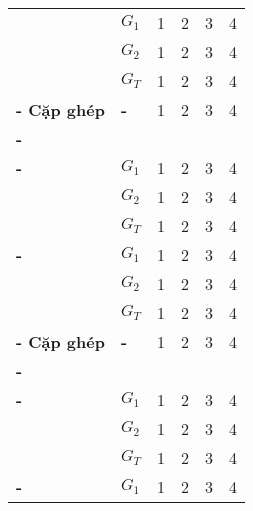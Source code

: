 \begin{longtabu}{| >{\bfseries\centering}p{2cm} | >{\bfseries\centering}p{0.5cm} | X[c] X[c] X[c] X[c] |}
	 \newline & $G_1$ & 1 & 2 & 3 & 4 \\
	& $G_2$ \newline & 1 & 2 & 3 & 4 \\
	& $G_T$ \newline & 1 & 2 & 3 & 4 \\
	\tabucline[1pt]-
	Cặp ghép \newline & - & 1 & 2 & 3 & 4 \\
	\tabucline[2pt]-
	 \\
	\tabucline[1pt]-
	 \newline & $G_1$ & 1 & 2 & 3 & 4 \\
	& $G_2$ \newline & 1 & 2 & 3 & 4 \\
	& $G_T$ \newline & 1 & 2 & 3 & 4 \\
	\tabucline[1pt]-
	 \newline & $G_1$ & 1 & 2 & 3 & 4 \\
	& $G_2$ \newline & 1 & 2 & 3 & 4 \\
	& $G_T$ \newline & 1 & 2 & 3 & 4 \\
	\tabucline[1pt]-
	Cặp ghép \newline & - & 1 & 2 & 3 & 4 \\
	\tabucline[2pt]-
	 \\
	\tabucline[1pt]-
	 \newline & $G_1$ & 1 & 2 & 3 & 4 \\
	& $G_2$ \newline & 1 & 2 & 3 & 4 \\
	& $G_T$ \newline & 1 & 2 & 3 & 4 \\
	\tabucline[1pt]-
	 \newline & $G_1$ & 1 & 2 & 3 & 4 \\

\end{longtabu}
